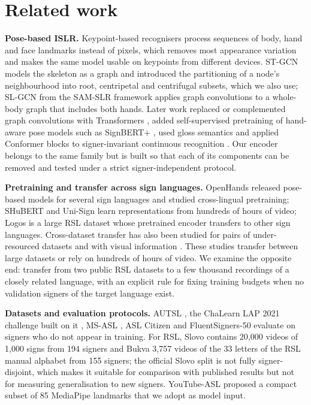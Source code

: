 \hypertarget{related-work}{%
\section{Related work}\label{related-work}}

\textbf{Pose-based ISLR.} Keypoint-based recognisers process sequences of body, hand and face landmarks instead of pixels, which removes most appearance variation and makes the same model usable on keypoints from different devices. ST-GCN \citep{2018_yan_stgcn} models the skeleton as a graph and introduced the partitioning of a node's neighbourhood into root, centripetal and centrifugal subsets, which we also use; SL-GCN from the SAM-SLR framework \citep{2021_jiang_sam_slr} applies graph convolutions to a whole-body graph that includes both hands. Later work replaced or complemented graph convolutions with Transformers \citep{2017_vaswani_attention}, added self-supervised pretraining of hand-aware pose models such as SignBERT+ \citep{2023_hu_signbert_plus}, used gloss semantics \citep{2023_zuo_nla_slr} and applied Conformer blocks \citep{2020_gulati_conformer} to signer-invariant continuous recognition \citep{2025_isharah_signer_invariant_conformer}. Our encoder belongs to the same family but is built so that each of its components can be removed and tested under a strict signer-independent protocol.

\textbf{Pretraining and transfer across sign languages.} OpenHands \citep{2022_selvaraj_openhands} released pose-based models for several sign languages and studied cross-lingual pretraining; SHuBERT \citep{2025_gueuwou_shubert} and Uni-Sign \citep{2025_li_uni_sign} learn representations from hundreds of hours of video; Logos \citep{2025_ovodov_logos} is a large RSL dataset whose pretrained encoder transfers to other sign languages. Cross-dataset transfer has also been studied for pairs of under-resourced datasets \citep{2024_kindiroglu_cross_dataset_transfer} and with visual information \citep{2023_ryumin_cross_language_transfer}. These studies transfer between large datasets or rely on hundreds of hours of video. We examine the opposite end: transfer from two public RSL datasets to a few thousand recordings of a closely related language, with an explicit rule for fixing training budgets when no validation signers of the target language exist.

\textbf{Datasets and evaluation protocols.} AUTSL \citep{2020_sincan_autsl}, the ChaLearn LAP 2021 challenge built on it \citep{2021_sincan_chalearn_lap_islr}, MS-ASL \citep{2019_joze_msasl}, ASL Citizen \citep{2023_desai_asl_citizen} and FluentSigners-50 \citep{2022_mukushev_fluentsigners50} evaluate on signers who do not appear in training. For RSL, Slovo \citep{2023_kapitanov_slovo} contains 20,000 videos of 1,000 signs from 194 signers and Bukva \citep{2024_kvanchiani_bukva} 3,757 videos of the 33 letters of the RSL manual alphabet from 155 signers; the official Slovo split is not fully signer-disjoint, which makes it suitable for comparison with published results but not for measuring generalisation to new signers. YouTube-ASL \citep{2023_uthus_youtube_asl} proposed a compact subset of 85 MediaPipe landmarks that we adopt as model input.


